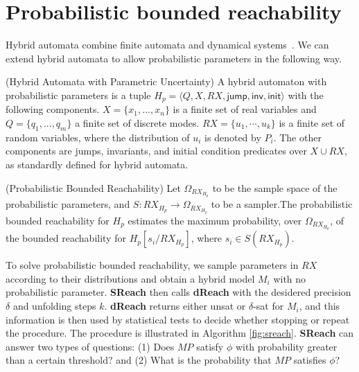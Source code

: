 \section{Probabilistic bounded reachability}

Hybrid automata combine finite automata and dynamical systems~\cite{henzinger2000theory}. We can extend hybrid automata to allow probabilistic parameters in the following way. 

\begin{definition}
\label{def:ha}
{\rm(Hybrid Automata with Parametric Uncertainty)} A hybrid automaton with probabilistic parameters is a tuple $H_p = \langle Q,X,RX,\mathsf{jump},\mathsf{inv},\mathsf{init}\rangle$
with the following components. $X = \{x_1,...,x_n\}$ is a finite set of real variables and $Q=\{q_1,...,q_m\}$ a finite set of discrete modes. $RX = \{ u_1, \cdots, u_k \}$ is a finite set of random variables, where the distribution of $u_i$ is denoted by $P_i$. The other components are jumps, invariants, and initial condition predicates over $X\cup RX$, as standardly defined for hybrid automata.
\end{definition}
\begin{definition}
\label{def:pbr}
{\rm (Probabilistic Bounded Reachability)}
Let $\Omega_{RX_{H_p}}$ to be the sample space of the probabilistic parameters, and $S: RX_{H_p} \to \Omega_{RX_{H_p}}$ to be a sampler.The probabilistic bounded reachability for $H_p$ estimates the maximum probability, over $\Omega_{RX_{H_p}}$, of the bounded reachability for $H_{p}[s_i/RX_{H_p}]$, where $s_i \in S(RX_{H_p})$.
\end{definition}
To solve probabilistic bounded reachability, we sample parameters in $RX$ according 
to their distributions and obtain a hybrid model $M_i$ with no probabilistic 
parameter. {\bf SReach} then calls {\bf dReach} \cite{gaodelta} with the desidered precision $\delta$ and 
unfolding steps $k$. {\bf dReach} returns either unsat or $\delta$-sat for $M_i$, and this information
is then used by statistical tests to decide whether stopping or repeat the procedure. The procedure is illustrated in Algorithm \ref{fig:sreach}. {\bf SReach} can answer two types of questions: (1) Does $MP$ satisfy $\phi$ with probability greater than a certain threshold? and (2) What is the probability that $MP$ satisfies $\phi$?
